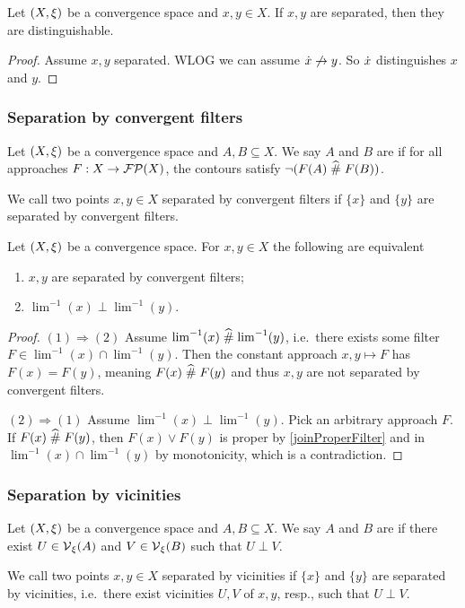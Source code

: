 \begin{lemma} \label{separatedDistinguishable}
Let $\sSet{X,\xi}$ be a convergence space and $x,y\in X$. If $x,y$ are separated, then they are distinguishable.
\end{lemma}
\begin{proof}
Assume $x,y$ separated. WLOG we can assume $\dot{x} \not\to y$. So $\dot{x}$ distinguishes $x$ and $y$.
\end{proof}

\subsubsection{Separation by convergent filters}
\begin{definition}
Let $\sSet{X,\xi}$ be a convergence space and $A,B\subseteq X$. We say $A$ and $B$ are  if for all approaches $F:X\to \operatorname{\mathcal{FP}}(X)$, the contours satisfy $\neg(F(A)\mathrel{\widehat{\#}} F(B))$.

We call two points $x,y\in X$ separated by convergent filters if $\{x\}$ and $\{y\}$ are separated by convergent filters.
\end{definition}

\begin{lemma} \label{pointsSeparatedConvergentFilters}
Let $\sSet{X,\xi}$ be a convergence space. For $x,y\in X$ the following are equivalent
\begin{enumerate}
\item $x,y$ are separated by convergent filters;
\item $\lim^{-1}(x)\perp \lim^{-1}(y)$.
\end{enumerate}
\end{lemma}
\begin{proof}
$(1) \Rightarrow (2)$ Assume $\lim^{-1}(x)\mathrel{\widehat{\#}} \lim^{-1}(y)$, i.e.\ there exists some filter $F\in \lim^{-1}(x)\cap \lim^{-1}(y)$. Then the constant approach $x,y\mapsto F$ has $F(x) = F(y)$, meaning $F(x)\mathrel{\widehat{\#}} F(y)$ and thus $x,y$ are not separated by convergent filters.

$(2) \Rightarrow (1)$ Assume $\lim^{-1}(x)\perp \lim^{-1}(y)$. Pick an arbitrary approach $F$. If $F(x)\mathrel{\widehat{\#}} F(y)$, then $F(x)\vee F(y)$ is proper by \ref{joinProperFilter} and in $\lim^{-1}(x)\cap \lim^{-1}(y)$ by monotonicity, which is a contradiction.
\end{proof}


\subsubsection{Separation by vicinities}
\begin{definition}
Let $\sSet{X,\xi}$ be a convergence space and $A,B\subseteq X$. We say $A$ and $B$ are  if there exist $U\in \operatorname{\mathcal{V}}_\xi(A)$ and $V\in\operatorname{\mathcal{V}}_\xi(B)$ such that $U\perp V$.

We call two points $x,y\in X$ separated by vicinities if $\{x\}$ and $\{y\}$ are separated by vicinities, i.e.\ there exist vicinities $U,V$ of $x,y$, resp., such that $U\perp V$.
\end{definition}

